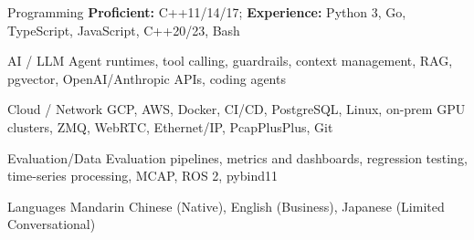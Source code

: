 
\begin{cvskills}
    \cvskill
    {Programming} %
    {
      \textbf{Proficient:} C++11/14/17; \textbf{Experience:} Python 3, Go, TypeScript, JavaScript, C++20/23, Bash
    } %

      \cvskill
      {AI / LLM} %
      {
        Agent runtimes, tool calling, guardrails, context management, RAG, pgvector, OpenAI/Anthropic APIs, coding agents
      } %

      \cvskill
      {Cloud / Network} %
      {
        GCP, AWS, Docker, CI/CD, PostgreSQL, Linux, on-prem GPU clusters, ZMQ, WebRTC, Ethernet/IP, PcapPlusPlus, Git
      } %

       \cvskill
      {Evaluation/Data} %
      {
         Evaluation pipelines, metrics and dashboards, regression testing, time-series processing, MCAP, ROS 2, pybind11
      } %

      \cvskill
        {Languages} %
        {Mandarin Chinese (Native), English (Business), Japanese (Limited Conversational)} %
    
\end{cvskills}
